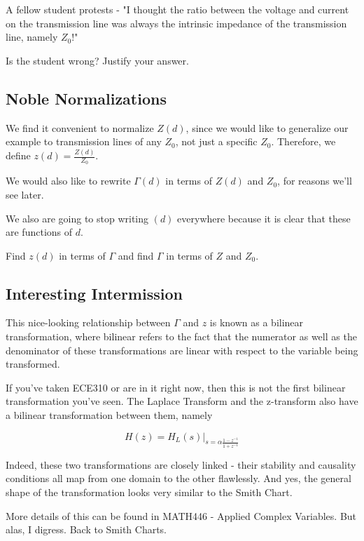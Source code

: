 \documentclass{article}
\begin{document}
A fellow student protests - "I thought the ratio between the voltage and current on the transmission line was always the intrinsic impedance of the transmission line, namely $Z_0$!"

Is the student wrong? Justify your answer.

\vspace{5cm}

\subsection{Noble Normalizations}

We find it convenient to normalize $Z(d)$, since we would like to generalize our example to transmission lines of any $Z_0$, not just a specific $Z_0$. Therefore, we define $z(d) = \frac{Z(d)}{Z_0}$.

We would also like to rewrite $\Gamma(d)$ in terms of $Z(d)$ and $Z_0$, for reasons we'll see later.

We also are going to stop writing $(d)$ everywhere because it is clear that these are functions of $d$.

Find $z(d)$ in terms of $\Gamma$ and find $\Gamma$ in terms of $Z$ and $Z_0$.

\vspace{3cm}

\subsection{Interesting Intermission}

This nice-looking relationship between $\Gamma$ and $z$ is known as a bilinear transformation, where bilinear refers to the fact that the numerator as well as the denominator of these transformations are linear with respect to the variable being transformed.

If you've taken ECE310 or are in it right now, then this is not the first bilinear transformation you've seen. The Laplace Transform and the z-transform also have a bilinear transformation between them, namely

$$H(z) = H_L(s) \vert_{s = \alpha \frac{1 - z^{-1}}{1+z^{-1}}}$$

Indeed, these two transformations are closely linked - their stability and causality conditions all map from one domain to the other flawlessly. And yes, the general shape of the transformation looks very similar to the Smith Chart.

More details of this can be found in MATH446 - Applied Complex Variables. But alas, I digress. Back to Smith Charts.
\end{document}

